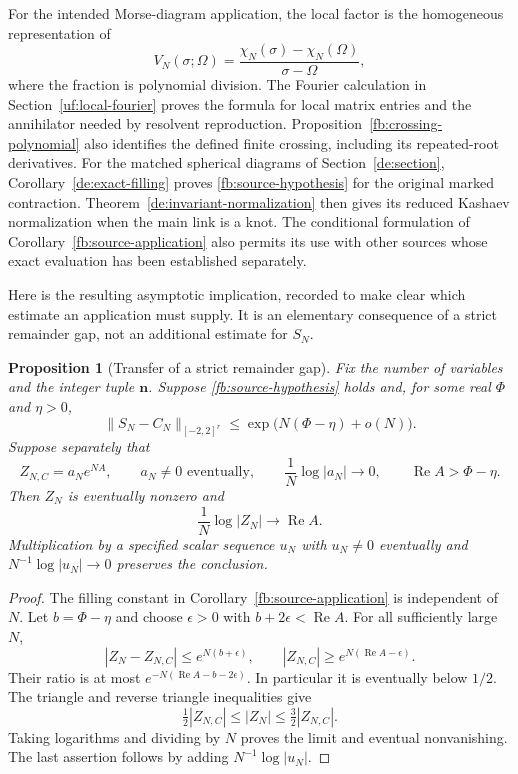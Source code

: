 \documentclass[11pt]{article}
\numberwithin{equation}{section}
\newtheorem{proposition}[theorem]{Proposition}
\theoremstyle{definition}\newtheorem{definition}[theorem]{Definition}
\theoremstyle{remark}\newtheorem{remark}[theorem]{Remark}
\begin{document}
For the intended Morse-diagram application, the local factor is the
homogeneous representation of
\[
 V_N(\sigma;\Omega)
       =\frac{\chi_N(\sigma)-\chi_N(\Omega)}{\sigma-\Omega},
\]
where the fraction is polynomial division. The Fourier calculation in
Section~\ref{uf:local-fourier} proves the formula for local matrix entries and the
annihilator needed by resolvent reproduction. Proposition~\ref{fb:crossing-polynomial} also identifies the defined
finite crossing, including its repeated-root derivatives.
For the matched spherical diagrams of Section~\ref{de:section},
Corollary~\ref{de:exact-filling} proves
\eqref{fb:source-hypothesis} for the original marked contraction.
Theorem~\ref{de:invariant-normalization} then gives its reduced Kashaev
normalization when the main link is a knot. The conditional formulation
of Corollary~\ref{fb:source-application} also permits its use with other
sources whose exact evaluation has been established separately.

Here is the resulting asymptotic implication, recorded to make clear
which estimate an application must supply. It is an elementary
consequence of a strict remainder gap, not an additional estimate for $S_N$.

\begin{proposition}[Transfer of a strict remainder gap]\label{fb:rate-transfer}
Fix the number of variables and the integer tuple $\boldsymbol n$.
Suppose \eqref{fb:source-hypothesis} holds and, for some real $\Phi$ and
$\eta>0$,
\[
 \|S_N-C_N\|_{[-2,2]^r}
       \le \exp\bigl(N(\Phi-\eta)+o(N)\bigr).
\]
Suppose separately that
\[
 Z_{N,C}=a_Ne^{NA},\qquad a_N\ne0\text{ eventually},\qquad
 \frac1N\log|a_N|\longrightarrow0,
 \qquad \operatorname{Re}A>\Phi-\eta.
\]
Then $Z_N$ is eventually nonzero and
\[
             \frac1N\log|Z_N|\longrightarrow\operatorname{Re}A.
\]
Multiplication by a specified scalar sequence $u_N$ with $u_N\ne0$
eventually and $N^{-1}\log|u_N|\to0$ preserves the conclusion.
\end{proposition}
\begin{proof}
The filling constant in Corollary~\ref{fb:source-application} is
independent of $N$. Let $b=\Phi-\eta$ and choose $\epsilon>0$ with
$b+2\epsilon<\operatorname{Re}A$. For all sufficiently large $N$,
\[
 |Z_N-Z_{N,C}|\le e^{N(b+\epsilon)},\qquad
 |Z_{N,C}|\ge e^{N(\operatorname{Re}A-\epsilon)}.
\]
Their ratio is at most $e^{-N(\operatorname{Re}A-b-2\epsilon)}$.
In particular it is eventually below $1/2$. The triangle and reverse
triangle inequalities give
\[
 \tfrac12|Z_{N,C}|\le|Z_N|\le\tfrac32|Z_{N,C}|.
\]
Taking logarithms and dividing by $N$ proves the limit and eventual
nonvanishing. The last assertion follows by adding
$N^{-1}\log|u_N|$.
\end{proof}
\end{document}
